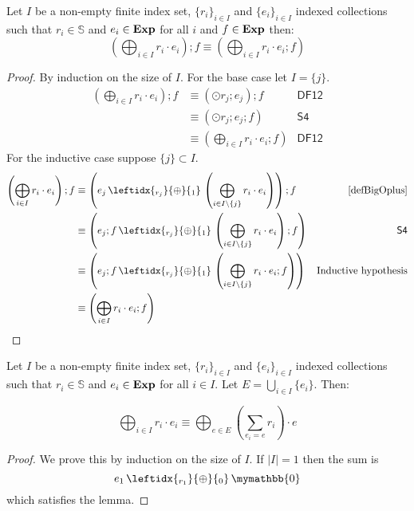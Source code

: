 \documentclass[a4paper,UKenglish,cleveref, autoref, thm-restate]{lipics-v2021}
\newcommand{\Exp}{\textbf{\upshape{Exp}}}
\newcommand{\WC}[2]{\,\leftidx{_{#1}}{{\oplus}}{_{#2}}\,}
\newcommand{\Ax}[1]{\ensuremath{\mathsf{#1}}}
\newcommand{\babort}{\mymathbb{0}}
\theoremstyle{plain}\newtheoremrep{thm}{Theorem}[section]
\begin{document}
\begin{toappendix}
\begin{rem}
		\end{rem}
		\begin{lem}
			Let $I$ be a non-empty finite index set, $\{r_i\}_{i\in I}$ and $\{e_i\}_{i\in I}$ indexed collections such that $r_i \in \mathbb S$ and $e_i \in \Exp$ for all $i$ and $f \in \Exp$ then:
			$$\left(\bigoplus_{i\in I}r_i\cdot e_i\right);f \equiv \left(\bigoplus_{i\in I}r_i\cdot e_i;f\right)$$ \label{lem61}
		\end{lem}
		\begin{proof}
			By induction on the size of $I$. For the base case let $I = \{j\}$.
			\begin{align*}
				\left(\bigoplus_{i\in I}r_i\cdot e_i\right);f &\equiv (\odot r_j;e_j);f&\Ax{DF12}\\ 
				&\equiv (\odot r_j;e_j;f)&\Ax{S4}\\ 
				&\equiv \left(\bigoplus_{i\in I}r_i\cdot e_i;f\right) &\Ax{DF12}
			\end{align*}
			For the inductive case suppose $\{j\} \subset I$.
			\begin{align*}
				\left(\bigoplus_{i\in I}r_i\cdot e_i\right);f &\equiv  \left(e_j \WC{r_j}{1} \left(\bigoplus_{i\in I\setminus\{j\}}r_i\cdot e_i\right)\right);f&\cref{defBigOplus}\\
				&\equiv  \left(e_j;f \WC{r_j}{1} \left(\bigoplus_{i\in I\setminus\{j\}}r_i\cdot e_i\right);f\right)&\Ax{S4}\\
				&\equiv  \left(e_j;f \WC{r_j}{1} \left(\bigoplus_{i\in I\setminus\{j\}}r_i\cdot e_i;f\right)\right)&\text{Inductive hypothesis}\\
				&\equiv  \left(\bigoplus_{i\in I}r_i\cdot e_i;f\right)& \rlap{\qedhere} 
			\end{align*}
		\end{proof}
		\begin{lem}
			Let $I$ be a non-empty finite index set, $\{r_i\}_{i\in I}$ and $\{e_i\}_{i\in I}$ indexed collections such that $r_i \in \mathbb S$ and $e_i \in \Exp$ for all $i\in I$. Let $E = \bigcup_{i \in I}\{e_i\}$. Then: 
			
			$$\bigoplus_{i \in I} r_i\cdot e_i \equiv \bigoplus_{e \in E}\left(\sum_{e_i=e}r_i\right)\cdot e$$ \label{lem63}
		\end{lem}
		\begin{proof}
			We prove this by induction on the size of $I$. If $|I| = 1$ then the sum is $$e_1 \WC{r_1}{0} \babort$$ which satisfies the lemma.
			

\end{proof}
\end{toappendix}
\end{document}
